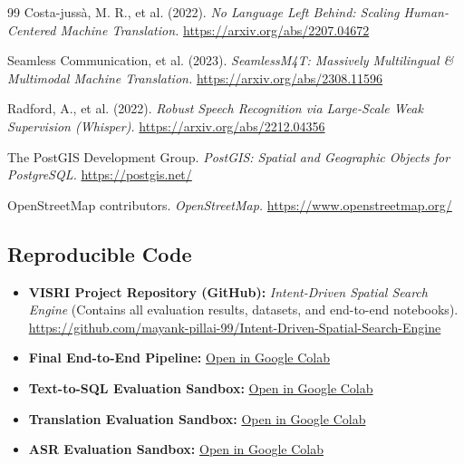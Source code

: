\documentclass[11pt,a4paper]{article}
\begin{document}
\begin{thebibliography}{99}
Costa-jussà, M. R., et al. (2022).
\textit{No Language Left Behind: Scaling Human-Centered Machine Translation.}
\url{https://arxiv.org/abs/2207.04672}

Seamless Communication, et al. (2023).
\textit{SeamlessM4T: Massively Multilingual \& Multimodal Machine Translation.}
\url{https://arxiv.org/abs/2308.11596}

Radford, A., et al. (2022).
\textit{Robust Speech Recognition via Large-Scale Weak Supervision (Whisper).}
\url{https://arxiv.org/abs/2212.04356}

The PostGIS Development Group.
\textit{PostGIS: Spatial and Geographic Objects for PostgreSQL.}
\url{https://postgis.net/}

OpenStreetMap contributors.
\textit{OpenStreetMap.}
\url{https://www.openstreetmap.org/}

\end{thebibliography}

\subsection*{Reproducible Code}
\begin{itemize}
    \item \textbf{VISRI Project Repository (GitHub):} \textit{Intent-Driven Spatial Search Engine} (Contains all evaluation results, datasets, and end-to-end notebooks). \url{https://github.com/mayank-pillai-99/Intent-Driven-Spatial-Search-Engine}
    \item \textbf{Final End-to-End Pipeline:} \href{https://colab.research.google.com/drive/1rGPOzieWGizHlFh2NJsk8GoBSVRxlEm3?usp=sharing}{Open in Google Colab}
    \item \textbf{Text-to-SQL Evaluation Sandbox:} \href{https://colab.research.google.com/drive/11Q3ZQRMpF2yn-kF79wgWye8HocaR4D7t?usp=sharing}{Open in Google Colab}
    \item \textbf{Translation Evaluation Sandbox:} \href{https://colab.research.google.com/drive/1OALHPylZlU80PdDcWf2Ta4oGDhPitphc?usp=sharing}{Open in Google Colab}
    \item \textbf{ASR Evaluation Sandbox:} \href{https://colab.research.google.com/drive/1JmLAVOBZkACmkh9jj7OI8seU4HkXCbrg?usp=sharing}{Open in Google Colab}
\end{itemize}
\end{document}
